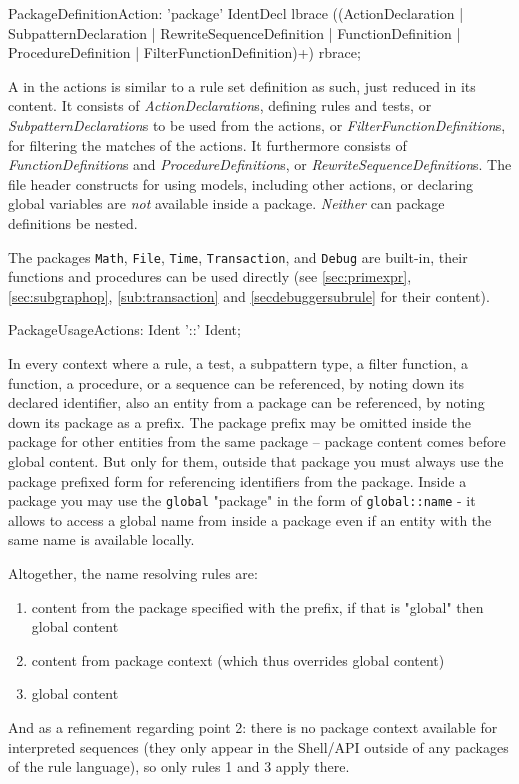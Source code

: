 \begin{rail}
  PackageDefinitionAction: 'package' IdentDecl lbrace ((ActionDeclaration | SubpatternDeclaration | RewriteSequenceDefinition | FunctionDefinition | ProcedureDefinition | FilterFunctionDefinition)+) rbrace;
\end{rail}

A  in the actions is similar to a rule set definition as such, just reduced in its content.
It consists of \emph{ActionDeclaration}s, defining rules and tests, or \emph{SubpatternDeclaration}s to be used from the actions, or \emph{FilterFunctionDefinition}s, for filtering the matches of the actions.
It furthermore consists of \emph{FunctionDefinition}s and \emph{ProcedureDefinition}s, or \emph{RewriteSequenceDefinition}s. 
The file header constructs for using models, including other actions, or declaring global variables are \emph{not} available inside a package.
\emph{Neither} can package definitions be nested.

The packages \texttt{Math}, \texttt{File}, \texttt{Time}, \texttt{Transaction}, and \texttt{Debug} are built-in, their functions and procedures can be used directly (see \ref{sec:primexpr}, \ref{sec:subgraphop}, \ref{sub:transaction} and \ref{secdebuggersubrule} for their content).

\begin{rail}
  PackageUsageActions: Ident '::' Ident;
\end{rail}

In every context where a rule, a test, a subpattern type, a filter function, a function, a procedure, or a sequence can be referenced, by noting down its declared identifier, 
also an entity from a package can be referenced,
by noting down its package as a prefix.
The package prefix may be omitted inside the package for other entities from the same package -- package content comes before global content.
But only for them, outside that package you must always use the package prefixed form for referencing identifiers from the package.
Inside a package you may use the \texttt{global} "package" in the form of \texttt{global::name} - it allows to access a global name from inside a package even if an entity with the same name is available locally.

Altogether, the name resolving rules are:
\begin{enumerate}
	\item content from the package specified with the prefix, if that is "global" then global content
	\item content from package context (which thus overrides global content)
	\item global content 
\end{enumerate}
And as a refinement regarding point 2: there is no package context available for interpreted sequences (they only appear in the Shell/API outside of any packages of the rule language), so only rules 1 and 3 apply there.

